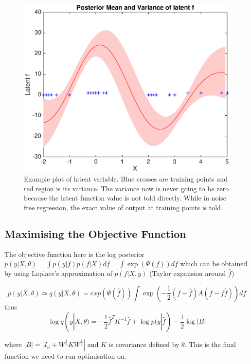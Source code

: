 \documentclass[14pt]{report}
\numberwithin{equation}{chapter}
\begin{document}
\begin{spacing}{2}
\begin{figure}
\centering
\includegraphics[scale=0.5]{classification_latent_f.eps}
\caption{Example plot of latent variable. Blue crosses are training points and red region is its variance. The variance now is never going to be zero because the latent function value is not told directly. While in noise free regression, the exact value of output at training points is told.}
\end{figure}

\subsection{Maximising the Objective Function}
The objective function here is the log posterior $p(y|X,\theta) = \int p(y|f)p(f|X) df = \int \operatorname{exp}(\Psi(f)) df$ which can be obtained by using Laplace's approximation of $p(f|X,y)$ (Taylor expansion around $\hat{f}$)

\begin{equation}
p(y|X,\theta) \simeq q(y|X,\theta) = exp(\Psi(\hat{f})) \int \operatorname{exp}(-\frac{1}{2}(f - \hat{f})A(f-f\hat{f})) df
\end{equation}
thus
\begin{equation}
\operatorname{log}q(y|X,\theta) = -\frac{1}{2}\hat{f}^TK^{-1}\hat{f} + \operatorname{log}p(y|\hat{f}) - \frac{1}{2}\operatorname{log}|B|
\end{equation}

where $|B| = |I_n + W^{\frac{1}{2}} K W^{\frac{1}{2}}|$ and $K$ is covariance defined by $\theta$. This is the final function we need to run optimisation on. 


\end{spacing}
\end{document}
